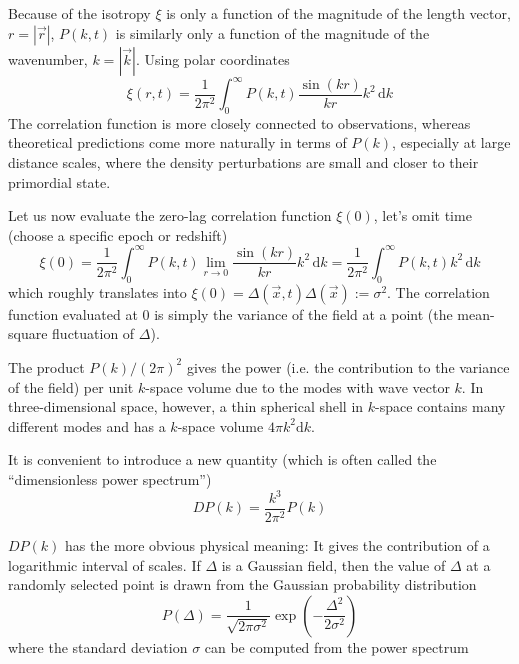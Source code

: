 Because of the isotropy $\xi$ is only a function of the magnitude of the length vector, $r=|\vec{r}|$, $P(k,t)$ is similarly only a function of the magnitude of the wavenumber, $k=|\vec{k}|$. Using polar coordinates
\begin{equation*}
    \xi(r,t) = \frac{1}{2\pi^{2}}\int_{0}^{\infty}P(k,t)\frac{\sin(kr)}{kr}k^{2}\,\text{d}k
\end{equation*}
The correlation function is more closely connected to observations, whereas theoretical predictions come more naturally in terms of $P(k)$, especially at large distance scales, where the density perturbations are small and closer to their primordial state.
\par Let us now evaluate the zero-lag correlation function $\xi(0)$, let’s omit time (choose a specific epoch or redshift)
\begin{equation*}
    \xi(0) = \frac{1}{2\pi^{2}}\int_{0}^{\infty}P(k,t)\lim_{r\to 0}\frac{\sin(kr)}{kr}k^{2}\,\text{d}k = \frac{1}{2\pi^{2}}\int_{0}^{\infty}P(k,t)k^{2}\,\text{d}k
\end{equation*}
which roughly translates into $\xi(0) = \Delta(\vec{x},t)\Delta(\vec{x}) := \sigma^{2}$. The correlation function evaluated at 0 is simply the variance of the field at a point (the mean-square fluctuation of $\Delta$).
\par The product $P(k)/(2\pi)^{2}$ gives the power (i.e. the contribution to the variance of the field) per unit $k$-space volume due to the modes with wave vector $k$. In three-dimensional space, however, a thin spherical shell in $k$-space contains many different modes and has a $k$-space volume $4\pi k^{2}\text{d}k$.
\par It is convenient to introduce a new quantity (which is often called the “dimensionless power spectrum”)
\begin{equation}
    DP(k) = \frac{k^{3}}{2\pi^{2}}P(k)
    \label{eq:dimensionlesspowerspectrum}
\end{equation}
\par $DP(k)$ has the more obvious physical meaning: It gives the contribution of a logarithmic interval of scales. If $\Delta$ is a Gaussian field, then the value of $\Delta$ at a randomly selected point is drawn from the Gaussian probability distribution
\begin{equation*}
    P(\Delta) = \frac{1}{\sqrt{2\pi\sigma^{2}}}\exp\left(-\frac{\Delta^{2}}{2\sigma^{2}}\right)
\end{equation*}
where the standard deviation $\sigma$ can be computed from the power spectrum 
